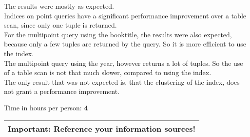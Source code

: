 \documentclass[11pt]{scrartcl}
\begin{document}
\medskip

The results were mostly as expected.\\
Indices on point queries have a significant performance improvement over a table scan, since only one tuple is returned.\\
For the multipoint query using the booktitle, the results were also expected, because only a few tuples are returned by the query. So it is more efficient to use the index.\\
The multipoint query using the year, however returns a lot of tuples. So the use of a table scan is not that much slower, compared to using the index.\\
The only result that was not expected is, that the clustering of the index, does not grant a performance improvement.

\bigskip

\noindent Time in hours per person: {\bf 4}

\bigskip

\begin{center}
  \begin{tabular}{c}
    \hline
    {\bf Important:} Reference your information sources!
    \\\hline
  \end{tabular}
\end{center}
\end{document}

